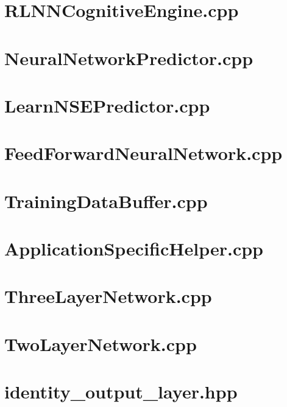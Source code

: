 \begin{appendices}
\section{RLNNCognitiveEngine.cpp}\label{app:CppCode:cogEng}

\clearpage
\section{NeuralNetworkPredictor.cpp}\label{app:CppCode:nnPredictor}

\clearpage
\section{LearnNSEPredictor.cpp} \label{app:CppCode:LearnNSE}

\clearpage
\section{FeedForwardNeuralNetwork.cpp} \label{app:CppCode:ffnn}

\clearpage
\section{TrainingDataBuffer.cpp} \label{app:CppCode:trainData}

\clearpage
\section{ApplicationSpecificHelper.cpp} \label{app:CppCode:appSpecObj}

\clearpage
\section{ThreeLayerNetwork.cpp} \label{app:CppCode:threeLayer}

\clearpage
\section{TwoLayerNetwork.cpp} \label{app:CppCode:twoLayer}

\clearpage
\section{identity\_output\_layer.hpp} \label{app:CppCode:identityOutput}

\clearpage

\end{appendices}
